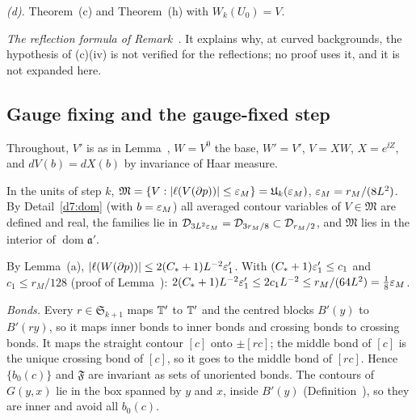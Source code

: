 \begin{detail}
\begin{step}
\end{step}
\begin{step}
\emph{(d).} Theorem~(c) and Theorem~(h) with $W_k(U_0)=V$.
\end{step}
\begin{step}
\emph{The reflection formula of Remark~.} It explains why, at curved backgrounds, the hypothesis of (c)(iv) is not verified for the reflections; no proof uses it, and it is not expanded here.
\end{step}
\end{detail}

\subsection{Gauge fixing and the gauge-fixed step}\label{d7:gf-sec}

Throughout, $V'$ is as in Lemma~, $W=V^0$ the base, $W'=V'$, $V=XW$, $X=e^{\ii Z}$, and $dV(b)=dX(b)$ by invariance of Haar measure.

\begin{detail}\label{d7:M}
\begin{step}
In the units of step $k$, $\mathfrak M=\{V:|\ell(V(\partial p))|\le\varepsilon_M\}=\mathfrak U_k(\varepsilon_M)$, $\varepsilon_M=r_M/(8L^2)$. By Detail~\ref{d7:dom} (with $b=\varepsilon_M$) all averaged contour variables of $V\in\mathfrak M$ are defined and real, the families lie in $\mathcal D_{3L^2\varepsilon_M}=\mathcal D_{3r_M/8}\subset\mathcal D_{r_M/2}$, and $\mathfrak M$ lies in the interior of $\operatorname{dom}\mathfrak a'$.
\end{step}
\begin{step}
By Lemma~(a), $|\ell(W(\partial p))|\le2(C_*+1)L^{-2}\varepsilon'_1$. With $(C_*+1)\varepsilon'_1\le c_1$ and $c_1\le r_M/128$ (proof of Lemma~): $2(C_*+1)L^{-2}\varepsilon'_1\le2c_1L^{-2}\le r_M/(64L^2)=\frac18\varepsilon_M$.
\end{step}
\begin{step}
\emph{Bonds.} Every $r\in\mathfrak S_{k+1}$ maps $\mathbb T'$ to $\mathbb T'$ and the centred blocks $B'(y)$ to $B'(ry)$, so it maps inner bonds to inner bonds and crossing bonds to crossing bonds. It maps the straight contour $[c]$ onto $\pm[rc]$; the middle bond of $[c]$ is the unique crossing bond of $[c]$, so it goes to the middle bond of $[rc]$. Hence $\{b_0(c)\}$ and $\mathfrak F$ are invariant as sets of unoriented bonds. The contours of $G(y,x)$ lie in the box spanned by $y$ and $x$, inside $B'(y)$ (Definition~), so they are inner and avoid all $b_0(c)$.
\end{step}
\end{detail}

